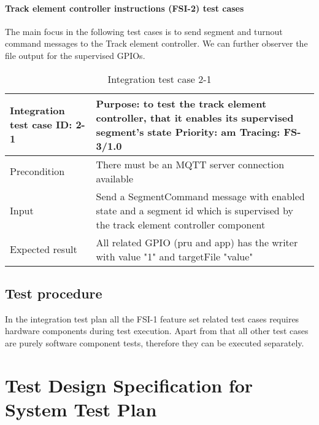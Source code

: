 \paragraph{Track element controller instructions (FSI-2) test cases}\label{p:TEC-ITC} The main focus in the following test cases is to send segment and turnout command messages to the Track element controller. We can further observer the file output for the supervised GPIOs.
\begin{table}[H]
	\caption{Integration test case 2-1}
	\label{table:TCase-FSI2-01}
	\begin{center}
		\renewcommand{\arraystretch}{1.8}
		\begin{tabu} 
			to 0.9 \textwidth
			{  X[0.3, l] X[l] }
			\toprule
			Integration test case ID: 2-1 & Purpose: to test the track element controller, that it enables its supervised segment's state \newline Priority: am \newline Tracing: FS-3/1.0 \\ \midrule
			Precondition                  & There must be an MQTT server connection available                                                                                              \\
			Input                         & Send a SegmentCommand message with enabled state and a segment id which is supervised by the track element controller component                \\
			Expected result               & All related GPIO (pru and app) has the writer with value "1" and targetFile "value"                                                            \\ \bottomrule
		\end{tabu}
	\end{center}
\end{table} 
\subsection{Test procedure} 
In the integration test plan all the FSI-1 feature set related test cases requires hardware components during test execution. Apart from that all other test cases are purely software component tests, therefore they can be executed separately.



\section{Test Design Specification for System Test Plan}

